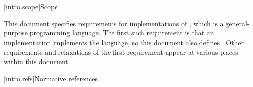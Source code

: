 
\clearpage
\bigskip\noindent{}
\bigskip\bigskip

\begingroup
\let\clearpage\relax
{}[intro.scope]{Scope}
\endgroup
{}
\thispagestyle{cpppageone}

\pnum
{}%
This document specifies requirements for implementations
of \Cpp{}, which is a general-purpose programming language.
The first such requirement is that
an implementation implements the language, so this document also
defines \Cpp{}. Other requirements and relaxations of the first
requirement appear at various places within this document.

[intro.refs]{Normative references}%
%

